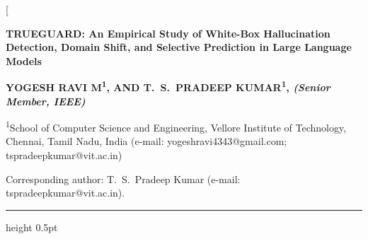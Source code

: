 \documentclass[10pt,twocolumn,letterpaper]{article}
\begin{document}
\twocolumn[
\begin{@twocolumnfalse}
\begin{flushleft}
  {\fontsize{19}{22}\selectfont\sffamily\bfseries\color{accessblue} TRUEGUARD: An Empirical Study of White-Box Hallucination Detection, Domain Shift, and Selective Prediction in Large Language Models\par}
  \vspace{8pt}
  {\fontsize{10.5}{13}\selectfont\sffamily\bfseries YOGESH RAVI M\textsuperscript{1}, AND T.\ S.\ PRADEEP KUMAR\textsuperscript{1}, {\normalfont\sffamily\itshape (Senior Member, IEEE)}\par}
  \vspace{3pt}
  {\footnotesize\sffamily\textsuperscript{1}School of Computer Science and Engineering, Vellore Institute of Technology, Chennai, Tamil Nadu, India (e-mail: yogeshravi4343@gmail.com; tspradeepkumar@vit.ac.in)\par}
  \vspace{2pt}
  {\footnotesize\sffamily Corresponding author: T.\ S.\ Pradeep Kumar (e-mail: tspradeepkumar@vit.ac.in).\par}
\end{flushleft}
\vspace{4pt}
\hrule height 0.5pt
\vspace{6pt}

\end{@twocolumnfalse}
\end{document}
